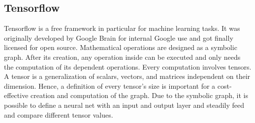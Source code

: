 \subsection{Tensorflow}
\label{sec:software-tensorflow}
Tensorflow is a free framework in particular for machine learning tasks.
It was originally developed by Google Brain for internal Google use and got finally licensed for open source. 
Mathematical operations are designed as a symbolic graph.
After its creation, any operation inside can be executed and only needs the computation of its dependent operations.
Every computation involves tensors.
A tensor is a generalization of scalars, vectors, and matrices independent on their dimension.
Hence, a definition of every tensor's size is important for a cost-effective creation and computation of the graph.
Due to the symbolic graph, it is possible to define a neural net with an input and output layer and steadily feed and compare different tensor values.